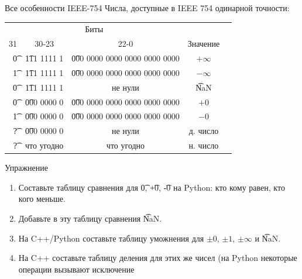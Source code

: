 \begin{frame}{Все особенности IEEE-754}
	Числа, доступные в IEEE 754 одинарной точности:
	\begin{center}
		\begin{tabular}{|r|c|c|c|c|}
			\multicolumn{3}{c}{Биты} & \\
			31 & 30-23 & 22-0 & Значение \\\hline
			\t{0} & \t{111 1111 1} & \t{000 0000 0000 0000 0000 0000} & $+\infty $\\
			\t{1} & \t{111 1111 1} & \t{000 0000 0000 0000 0000 0000} & $-\infty $\\
			\t{0} & \t{111 1111 1} & не нули                          & \t{NaN} \\
			\t{0} & \t{000 0000 0} & \t{000 0000 0000 0000 0000 0000} & $+0$ \\
			\t{1} & \t{000 0000 0} & \t{000 0000 0000 0000 0000 0000} & $-0$ \\
			\t{?} & \t{000 0000 0} & не нули                          & д. число \\
			\t{?} & что угодно     & что угодно                       & н. число \\
		\end{tabular}
	\end{center}	
\end{frame}

\begin{frame}{Упражнение}
	\begin{enumerate}
		\item
			Составьте таблицу сравнения для \t{0}, \t{+0}, \t{-0} на Python: кто кому равен, кто кого меньше.
		\item
			Добавьте в эту таблицу сравнения \t{NaN}.
		\item
			На C++/Python составьте таблицу уможнения для $\pm0$, $\pm 1$, $\pm \infty$ и \t{NaN}.
		\item
			На C++ составьте таблицу деления для этих же чисел (на Python некоторые операции вызывают исключение
	\end{enumerate}
\end{frame}
